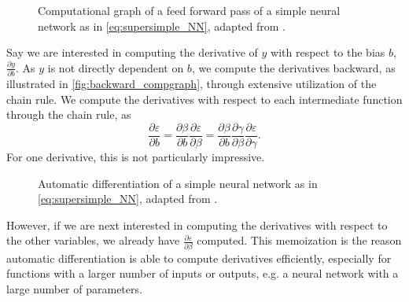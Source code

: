 \begin{figure}[h]
\centering

\caption{Computational graph of a feed forward pass of a simple neural network as in \eqref{eq:supersimple_NN}, adapted from \cite{autodiff}.}
\label{fig:forward_compgraph}
\end{figure}

Say we are interested in computing the derivative of $y$ with respect to the bias $b$, $\frac{\partial y}{\partial b}$.
As $y$ is not directly dependent on $b$, we compute the derivatives backward, as illustrated in \autoref{fig:backward_compgraph}, through extensive utilization of the chain rule.
We compute the derivatives with respect to each intermediate function through the chain rule, as
\begin{equation}
    \frac{\partial \varepsilon}{\partial b} = \frac{\partial \beta}{\partial b} \frac{\partial \varepsilon}{\partial \beta} = 
    \frac{\partial \beta}{\partial b}
    \frac{\partial \gamma}{\partial \beta}
    \frac{\partial \varepsilon}{\partial \gamma}.
\end{equation}
For one derivative, this is not particularly impressive.

\begin{figure}[h]
\centering

\caption{Automatic differentiation of a simple neural network as in \eqref{eq:supersimple_NN}, adapted from \cite{autodiff}.}
\label{fig:backward_compgraph}
\end{figure}

However, if we are next interested in computing the derivatives with respect to the other variables, we already have $\frac{\partial \varepsilon}{\partial \beta}$ computed.
This memoization is the reason automatic differentiation is able to compute derivatives efficiently, especially for functions with a larger number of inputs or outputs, e.g. a neural network with a large number of parameters.




